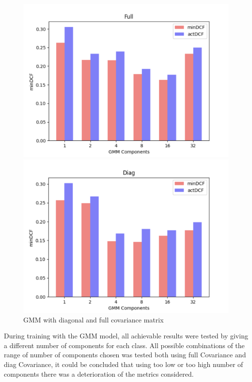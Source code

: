 \documentclass{article}
\begin{document}
\begin{figure}[H]
    \centering
    \begin{minipage}{.3\textwidth}
        \centering
        \includegraphics[width=\linewidth]{./img/GMM_Full.png}    
    \end{minipage}%
    \begin{minipage}{.3\textwidth}
        \centering
        \includegraphics[width=\linewidth]{./img/GMM_diag.png}
    \end{minipage}
    \caption{GMM with diagonal and full covariance matrix} %
    \label{fig:GMM_hist} 
\end{figure}
During training with the GMM model, all achievable results were tested by giving a different number of components for each class. All possible combinations of the range of number of components chosen was tested both using full Covariance and diag Covariance, it could be concluded that using too low or too high number of components there was a deterioration of the metrics considered.\\
\end{document}
